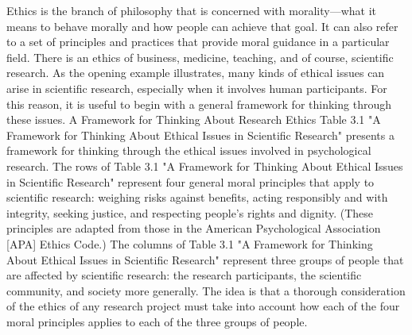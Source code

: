 Ethics is the branch of philosophy that is concerned with morality---what it means to behave morally and how people can achieve that goal. It can also refer to a set of principles and practices that provide moral guidance in a particular field. There is an ethics of business, medicine, teaching, and of course, scientific research. As the opening example illustrates, many kinds of ethical issues can arise in scientific research, especially when it involves human participants. For this reason, it is useful to begin with a general framework for thinking through these issues.
A Framework for Thinking About Research Ethics
Table 3.1 "A Framework for Thinking About Ethical Issues in Scientific Research" presents a framework for thinking through the ethical issues involved in psychological research. The rows of Table 3.1 "A Framework for Thinking About Ethical Issues in Scientific Research" represent four general moral principles that apply to scientific research: weighing risks against benefits, acting responsibly and with integrity, seeking justice, and respecting people's rights and dignity. (These principles are adapted from those in the American Psychological Association [APA] Ethics Code.) The columns of Table 3.1 "A Framework for Thinking About Ethical Issues in Scientific Research" represent three groups of people that are affected by scientific research: the research participants, the scientific community, and society more generally. The idea is that a thorough consideration of the ethics of any research project must take into account how each of the four moral principles applies to each of the three groups of people.

